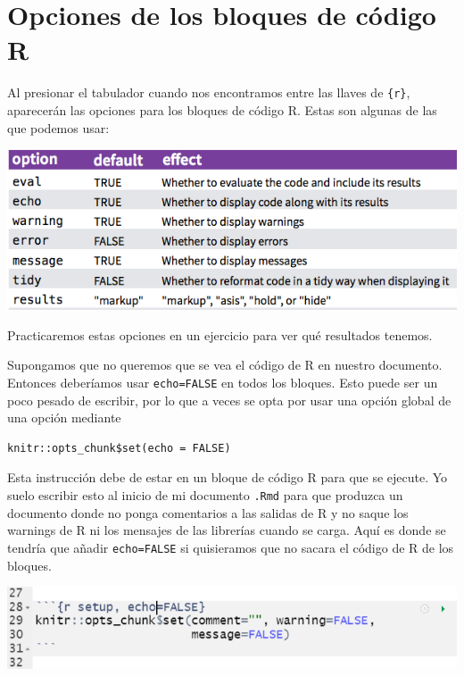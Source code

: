 \documentclass[
]{book}
\begin{document}
\hypertarget{opciones-de-los-bloques-de-cuxf3digo-r}{%
\section{Opciones de los bloques de código R}\label{opciones-de-los-bloques-de-cuxf3digo-r}}

Al presionar el tabulador cuando nos encontramos entre las llaves de \texttt{\textasciigrave{}\textasciigrave{}\textasciigrave{}\{r\}}, aparecerán las opciones para los bloques de código R. Estas son algunas de las que podemos usar:

\includegraphics{figures/opciones_chunk.png}

Practicaremos estas opciones en un ejercicio para ver qué resultados tenemos.

Supongamos que no queremos que se vea el código de R en nuestro documento. Entonces deberíamos usar \texttt{echo=FALSE} en todos los bloques. Esto puede ser un poco pesado de escribir, por lo que a veces se opta por usar una opción global de una opción mediante

\begin{verbatim}
knitr::opts_chunk$set(echo = FALSE)
\end{verbatim}

Esta instrucción debe de estar en un bloque de código R para que se ejecute. Yo suelo escribir esto al inicio de mi documento \texttt{.Rmd} para que produzca un documento donde no ponga comentarios a las salidas de R y no saque los warnings de R ni los mensajes de las librerías cuando se carga. Aquí es donde se tendría que añadir \texttt{echo=FALSE} si quisieramos que no sacara el código de R de los bloques.

\includegraphics{figures/chunk_inicial.png}
\end{document}
